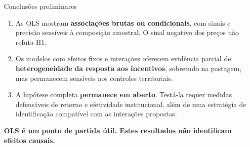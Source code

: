 \documentclass[aspectratio=169,11pt]{beamer}
\newcommand{\fonte}[1]{\par\vfill{\fontsize{7.5}{9}\selectfont\color{gray}Fonte: #1\par}}
\begin{document}
\begin{frame}{Conclusões preliminares}
\begin{enumerate}
\setlength{\itemsep}{4mm}
\item As OLS mostram \textbf{associações brutas ou condicionais}, com sinais e precisão sensíveis à composição amostral. O sinal negativo dos preços não refuta H1.
\item Os modelos com efeitos fixos e interações oferecem evidência parcial de \textbf{heterogeneidade da resposta aos incentivos}, sobretudo na pastagem, mas permanecem sensíveis aos controles territoriais.
\item A hipótese completa \textbf{permanece em aberto}. Testá-la requer medidas defensáveis de retorno e efetividade institucional, além de uma estratégia de identificação compatível com as interações propostas.
\end{enumerate}
\medskip
\centering\color{verde}\textbf{OLS é um ponto de partida útil. Estes resultados não identificam efeitos causais.}
\end{frame}
\end{document}
